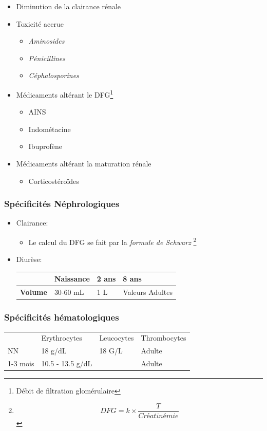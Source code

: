 \documentclass[11pt]{article}
\begin{document}
\begin{enumerate}
\begin{itemize}
\begin{itemize}
\item Diminution de la clairance rénale
\item Toxicité accrue
\begin{itemize}
\item \emph{Aminosides}
\item \emph{Pénicillines}
\item \emph{Céphalosporines}
\end{itemize}
\item Médicaments altérant le DFG\footnote{Débit de filtration glomérulaire}
\begin{itemize}
\item AINS
\item Indométacine
\item Ibuprofène
\end{itemize}
\item Médicaments altérant la maturation rénale
\begin{itemize}
\item Corticostéroïdes
\end{itemize}
\end{itemize}
\end{itemize}
\end{enumerate}
\subsubsection{Spécificités Néphrologiques}
\label{sec:org8b90207}
\begin{itemize}
\item Clairance:
\begin{itemize}
\item Le calcul du DFG se fait par la \emph{formule de Schwarz}
\footnote{\[DFG = k \times \frac{T}{Créatinémie}\]}
\end{itemize}

\item Diurèse:
\begin{center}
\begin{tabular}{llll}
 & Naissance & 2 ans & 8 ans\\
\hline
\textbf{Volume} & 30-60 mL & 1 L & Valeurs Adultes\\
\end{tabular}
\end{center}
\end{itemize}
\subsubsection{Spécificités hématologiques}
\label{sec:org5daaa07}
\begin{center}
\begin{tabular}{llll}
 & Erythrocytes & Leucocytes & Thrombocytes\\
NN & 18 g/dL & 18 G/L & Adulte\\
1-3 mois & 10.5 - 13.5 g/dL &  & Adulte\\
\end{tabular}
\end{center}
\end{document}

